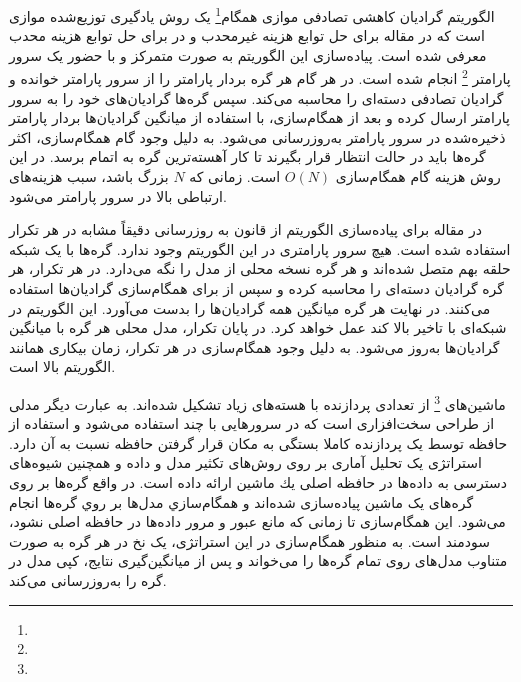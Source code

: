 الگوریتم گرادیان کاهشی تصادفی موازی همگام\footnote{}   یک روش یادگیری توزیع‌شده موازی است که در مقاله \cite{Mini2016} برای حل توابع هزینه غیرمحدب و در \cite{dekel2012} برای حل توابع هزینه محدب معرفی شده است. پیاده‌سازی این الگوریتم به صورت متمرکز و با حضور یک سرور پارامتر  \footnote{} انجام شده است. در هر گام هر گره بردار پارامتر را از سرور پارامتر خوانده و گرادیان تصادفی دسته‌ای را محاسبه می‌کند. سپس گره‌ها گرادیان‌های خود را به سرور پارامتر ارسال کرده و بعد از همگام‌سازی، با استفاده از میانگین گرادیان‌ها بردار پارامتر ذخیره‌شده در سرور پارامتر به‌روزرسانی می‌شود. به دلیل وجود گام همگام‌سازی، اکثر گره‌ها باید در حالت انتظار قرار بگیرند تا کار آهسته‌ترین گره به اتمام برسد. در این روش هزینه گام‌ همگام‌سازی $O(N)$ است. زمانی که $N$ بزرگ باشد، سبب هزینه‌های ارتباطی بالا در سرور پارامتر می‌شود. 

در مقاله \cite{nccl} برای پیاده‌سازی الگوریتم  از قانون به روزرسانی دقیقاً مشابه  در هر تکرار استفاده شده است. هیچ سرور پارامتری در این الگوریتم وجود ندارد. گره‌ها با یک شبکه حلقه بهم متصل شده‌اند و هر گره نسخه محلی از مدل را نگه می‌دارد. در هر تکرار، هر گره گرادیان دسته‌ای را محاسبه کرده و سپس از  برای همگام‌سازی گرادیان‌ها استفاده می‌کنند. در نهایت هر گره میانگین همه گرادیان‌ها را بدست می‌آورد. این الگوریتم در شبکه‌ای با تاخیر بالا کند عمل خواهد کرد. در پایان تکرار، مدل محلی هر گره با میانگین گرادیان‌ها به‌روز می‌شود. به دلیل وجود همگام‌سازی در هر تکرار، زمان بیکاری همانند الگوریتم  بالا است. 

ماشین‌های  \footnote{} از تعدادی پردازنده  با هسته‌های زیاد تشکیل شده‌اند. به عبارت دیگر مدلی از طراحی سخت‌افزاری است که در سرورهایی با چند  استفاده می‌شود و استفاده از حافظه توسط یک پردازنده  کاملا بستگی به مکان قرار گرفتن حافظه نسبت به آن دارد. استراتژی   \cite{DimmWitted} یک تحلیل آماری بر روی روش‌های تکثیر مدل و داده و همچنین شیوه‌های دسترسی به داده‌ها در حافظه اصلی يك ماشين  ارائه داده است. در واقع گره‌ها بر روی گره‌های یک ماشین  پیاده‌سازی شده‌اند و همگام‌سازي مدل‌ها بر روي گره‌ها انجام می‌شود. این همگام‌سازی تا زمانی‌ که مانع عبور و مرور داده‌ها در حافظه اصلی نشود، سودمند است. به منظور همگام‌سازی در این استراتژی، یک نخ در هر گره به صورت متناوب مدل‌های روی تمام گره‌ها را می‌خواند و پس از میانگین‌گیری نتایج، کپی مدل ‌در گره را به‌روزرسانی می‌‌کند.

